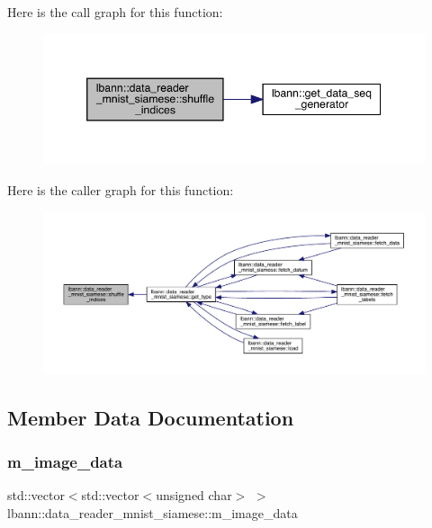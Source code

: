 Here is the call graph for this function\+:\nopagebreak
\begin{figure}[H]
\begin{center}
\leavevmode
\includegraphics[width=346pt]{classlbann_1_1data__reader__mnist__siamese_ad1949fc1a71af86d792e927c0181f87d_cgraph}
\end{center}
\end{figure}
Here is the caller graph for this function\+:\nopagebreak
\begin{figure}[H]
\begin{center}
\leavevmode
\includegraphics[width=350pt]{classlbann_1_1data__reader__mnist__siamese_ad1949fc1a71af86d792e927c0181f87d_icgraph}
\end{center}
\end{figure}


\subsection{Member Data Documentation}
\mbox{\label{classlbann_1_1data__reader__mnist__siamese_a5b664a53047546c1be6d19ecabbd30dc}} 
\subsubsection{\texorpdfstring{m\+\_\+image\+\_\+data}{m\_image\_data}}
{\footnotesize\ttfamily std\+::vector$<$std\+::vector$<$unsigned char$>$ $>$ lbann\+::data\+\_\+reader\+\_\+mnist\+\_\+siamese\+::m\+\_\+image\+\_\+data\hspace{0.3cm}{\ttfamily [protected]}}



